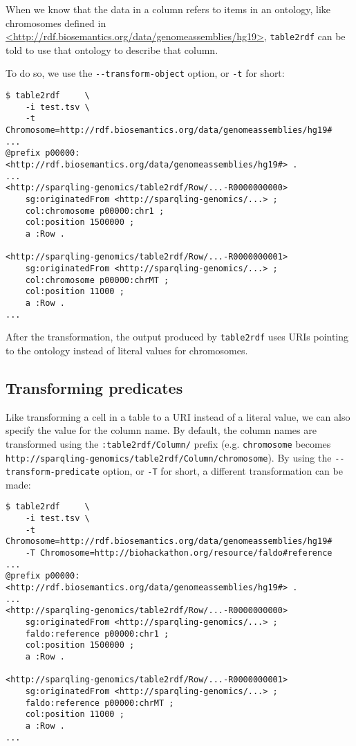   \begin{sloppypar}
  When we know that the data in a column refers to items in an ontology, like
  chromosomes defined in
  \href{http://rdf.biosemantics.org/data/genomeassemblies/hg19}%
  {<http://rdf.biosemantics.org/data/genomeassemblies/hg19>}, \texttt{table2rdf}
  can be told to use that ontology to describe that column.
  \end{sloppypar}

  To do so, we use the \texttt{-{}-transform-object} option, or \texttt{-t}
  for short:

\begin{siderules}
\begin{verbatim}
$ table2rdf     \
    -i test.tsv \
    -t Chromosome=http://rdf.biosemantics.org/data/genomeassemblies/hg19#
...
@prefix p00000: <http://rdf.biosemantics.org/data/genomeassemblies/hg19#> .
...
<http://sparqling-genomics/table2rdf/Row/...-R0000000000>
    sg:originatedFrom <http://sparqling-genomics/...> ;
    col:chromosome p00000:chr1 ;
    col:position 1500000 ;
    a :Row .

<http://sparqling-genomics/table2rdf/Row/...-R0000000001>
    sg:originatedFrom <http://sparqling-genomics/...> ;
    col:chromosome p00000:chrMT ;
    col:position 11000 ;
    a :Row .
...
\end{verbatim}
\end{siderules}

  After the transformation, the output produced by \texttt{table2rdf} uses
  URIs pointing to the ontology instead of literal values for chromosomes.

\subsection{Transforming predicates}

  Like transforming a cell in a table to a URI instead of a literal value,
  we can also specify the value for the column name.  By default, the column
  names are transformed using the \texttt{:table2rdf/Column/} prefix (e.g.
  \texttt{chromosome} becomes
  \texttt{http://sparqling-genomics/table2rdf/Column/chromosome}).  By using
  the \texttt{-{}-transform-predicate} option, or \texttt{-T} for short, a
  different transformation can be made:

\begin{siderules}
\begin{verbatim}
$ table2rdf     \
    -i test.tsv \
    -t Chromosome=http://rdf.biosemantics.org/data/genomeassemblies/hg19#
    -T Chromosome=http://biohackathon.org/resource/faldo#reference
...
@prefix p00000: <http://rdf.biosemantics.org/data/genomeassemblies/hg19#> .
...
<http://sparqling-genomics/table2rdf/Row/...-R0000000000>
    sg:originatedFrom <http://sparqling-genomics/...> ;
    faldo:reference p00000:chr1 ;
    col:position 1500000 ;
    a :Row .

<http://sparqling-genomics/table2rdf/Row/...-R0000000001>
    sg:originatedFrom <http://sparqling-genomics/...> ;
    faldo:reference p00000:chrMT ;
    col:position 11000 ;
    a :Row .
...
\end{verbatim}
\end{siderules}

